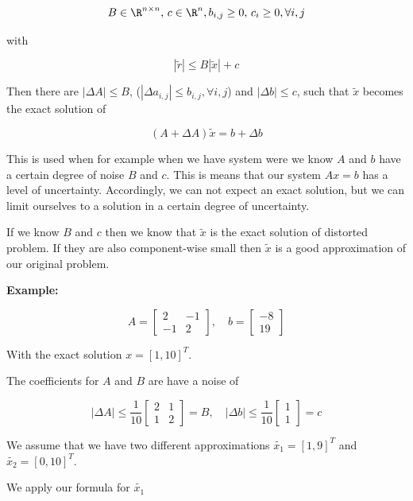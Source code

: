 \[
    B \in \R^{n \times n}, \, c \in \R^n, b_{i,j} \ge 0, \, c_i \ge 0, \forall i, j
\]

with 

\[
    |\tilde{r}| \le B |\tilde{x}| + c
\]

Then there are \(|\Delta A| \le B\), (\(|\Delta a_{i,j}| \le b_{i,j}, \forall i,j\)) and \(|\Delta b| \le c\), such that \(\tilde{x}\) becomes the exact 
solution of 

\[
    (A + \Delta A) \tilde{x} = b + \Delta b
\]

This is used when for example when we have system were we know \(A\) and \(b\) have a certain degree of noise 
\(B\) and \(c\). This is means that our system \(Ax = b\) has a level of uncertainty. Accordingly, we can not expect an 
exact solution, but we can limit ourselves to a solution in a certain degree of uncertainty.

If we know \(B\) and \(c\) then we know that \(\tilde{x}\) is the exact solution of distorted problem. If they are also 
component-wise small then \(\tilde{x}\) is a good approximation of our original problem.

\textbf{Example:}

\[
    A = 
    \begin{bmatrix}
        2 & -1 \\ 
        -1 & 2
    \end{bmatrix}
    , \quad 
    b = 
    \begin{bmatrix}
        -8 \\
        19
    \end{bmatrix}
\]

With the exact solution \(x = [1, 10]^T\).

The coefficients for \(A\) and \(B\) are have a noise of

\[
    |\Delta A| \le \frac{1}{10} 
    \begin{bmatrix}
        2 & 1 \\ 
        1 & 2
    \end{bmatrix}
    = B
    , \quad 
    |\Delta b| \le \frac{1}{10}
    \begin{bmatrix}
        1 \\ 
        1
    \end{bmatrix}
    = c
\]

We assume that we have two different approximations \(\tilde{x_1} = [1, 9]^T\) and 
\(\tilde{x_2} = [0, 10]^T\). 

We apply our formula for \(\tilde{x_1}\)


